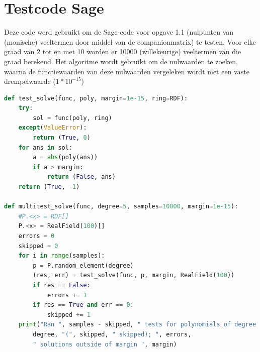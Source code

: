 \documentclass{article}
\begin{document}
\newpage

\appendix{}
\section{Testcode Sage}
Deze code werd gebruikt om de Sage-code voor opgave 1.1 (nulpunten van (monische) veeltermen door middel van de companionmatrix) te testen. Voor elke graad van 2 tot en met 10 worden er 10000 (willekeurige) veeltermen van die graad berekend. Het algoritme wordt gebruikt om de nulwaarden te zoeken, waarna de functiewaarden van deze nulwaarden vergeleken wordt met een vaste drempelwaarde (\(1*10^{-15}\))
\begin{lstlisting}[language=Python]
def test_solve(func, poly, margin=1e-15, ring=RDF):
    try:
        sol = func(poly, ring)
    except(ValueError):
        return (True, 0)
    for ans in sol:
        a = abs(poly(ans))
        if a > margin:
            return (False, ans)
    return (True, -1)

def multitest_solve(func, degree=5, samples=10000, margin=1e-15):
    #P.<x> = RDF[]
    P.<x> = RealField(100)[]
    errors = 0
    skipped = 0
    for i in range(samples):
        p = P.random_element(degree)
        (res, err) = test_solve(func, p, margin, RealField(100))
        if res == False:
            errors += 1
        if res == True and err == 0:
            skipped += 1
    print("Ran ", samples - skipped, " tests for polynomials of degree ",
    	degree, "(", skipped, " skipped); ", errors,
    	" solutions outside of margin ", margin)
\end{lstlisting}
\end{document}
